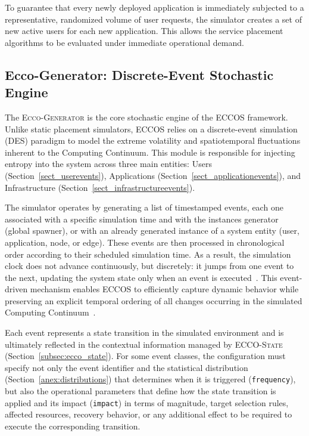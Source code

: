 \documentclass[ASNA]{USG} %
\begin{document}
To guarantee that every newly deployed application is immediately subjected to a representative, randomized volume of user requests, the simulator creates a set of new active users for each new application. This allows the service placement algorithms to be evaluated under immediate operational demand.


\subsection{Ecco-Generator: Discrete-Event Stochastic Engine}
\label{sec:ecco_generator}


The \textsc{Ecco-Generator} is the core stochastic engine of the \textsc{ECCOS} framework. Unlike static placement simulators, \textsc{ECCOS} relies on a discrete-event simulation (DES) paradigm to model the extreme volatility and spatiotemporal fluctuations inherent to the Computing Continuum. This module is responsible for injecting entropy into the system across three main entities: Users (Section~\ref{sect_userevents}), Applications (Section~\ref{sect_applicationevents}), and Infrastructure (Section~\ref{sect_infrastructureevents}). 

The simulator operates by generating a list of timestamped events, each one associated with a specific simulation time and with the instances generator (global spawner), or with an already generated instance of a system entity (user, application, node, or edge). These events are then processed in chronological order according to their scheduled simulation time. As a result, the simulation clock does not advance continuously, but discretely: it jumps from one event to the next, updating the system state only when an event is executed~\cite{1611320}. This event-driven mechanism enables ECCOS to efficiently capture dynamic behavior while preserving an explicit temporal ordering of all changes occurring in the simulated Computing Continuum~\cite{MasipBruin2021Managing}.


Each event represents a state transition in the simulated environment and is ultimately reflected in the contextual information managed by \textsc{ECCO-State} (Section~\ref{subsec:ecco_state}). For some event classes, the configuration must specify not only the event identifier and the statistical distribution (Section~\ref{anex:distributions}) that determines when it is triggered (\texttt{frequency}), but also the operational parameters that define how the state transition is applied and its impact (\texttt{impact}) in terms of magnitude, target selection rules, affected resources, recovery behavior, or any additional effect to be required to execute the corresponding transition.
\end{document}

